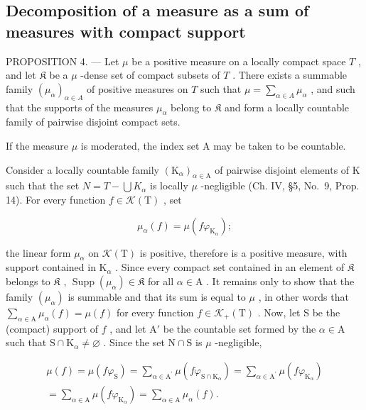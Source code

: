 \subsection{Decomposition of a measure as a sum of measures with compact support}

PROPOSITION 4. --- Let \(\mu\) be a positive measure on a locally compact space \(T\) , and let \(\mathfrak{K}\) be a \(\mu\) -dense set of compact subsets of \(T\) . There exists a summable family \((\mu_{\alpha})_{\alpha \in A}\) of positive measures on \(T\) such that \(\mu = \sum_{\alpha \in A} \mu_{\alpha}\) , and such that the supports of the measures \(\mu_{\alpha}\) belong to \(\mathfrak{K}\) and form a locally countable family of pairwise disjoint compact sets.

If the measure \(\mu\) is moderated, the index set A may be taken to be countable.

Consider a locally countable family \((\mathrm{K}_{\alpha})_{\alpha\in\mathrm{A}}\) of pairwise disjoint elements of K such that the set \(N = T - \bigcup K_{\alpha}\) is locally \(\mu\) -negligible (Ch. IV, §5, No.~9, Prop. 14). For every function \(f \in \mathcal{K}(\mathrm{T})\) , set

\[
\mu_ {\alpha} (f) = \mu (f \varphi_ {\mathrm{K} _ {\alpha}});
\]

the linear form \(\mu_{\alpha}\) on \(\mathcal{K}(\mathrm{T})\) is positive, therefore is a positive measure, with support contained in \(\mathrm{K}_{\alpha}\) . Since every compact set contained in an element of \(\mathfrak{K}\) belongs to \(\mathfrak{K}\) , \(\operatorname{Supp}(\mu_{\alpha}) \in \mathfrak{K}\) for all \(\alpha \in \mathrm{A}\) . It remains only to show that the family \((\mu_{\alpha})\) is summable and that its sum is equal to \(\mu\) , in other words that \(\sum_{\alpha \in \mathrm{A}} \mu_{\alpha}(f) = \mu(f)\) for every function \(f \in \mathcal{K}_{+}(\mathrm{T})\) . Now, let S be the (compact) support of \(f\) , and let \(\mathrm{A}'\) be the countable set formed by the \(\alpha \in \mathrm{A}\) such that \(\mathrm{S} \cap \mathrm{K}_{\alpha} \neq \varnothing\) . Since the set \(\mathrm{N} \cap \mathrm{S}\) is \(\mu\) -negligible,

\[
\begin{array}{c} \mu (f) = \mu (f \varphi_ {\mathrm{S}}) = \sum_ {\alpha \in \mathrm{A} ^ {\prime}} \mu (f \varphi_ {\mathrm{S} \cap \mathrm{K} _ {\alpha}}) = \sum_ {\alpha \in \mathrm{A} ^ {\prime}} \mu (f \varphi_ {\mathrm{K} _ {\alpha}}) \\ = \sum_ {\alpha \in \mathrm{A}} \mu (f \varphi_ {\mathrm{K} _ {\alpha}}) = \sum_ {\alpha \in \mathrm{A}} \mu_ {\alpha} (f). \end{array}
\]

